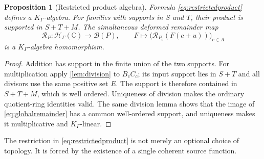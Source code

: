 \documentclass[11pt,letterpaper]{article}
\newtheorem{proposition}[theorem]{Proposition}
\theoremstyle{definition}
\theoremstyle{remark}
\newcommand{\C}{\mathbb C}
\newcommand{\HH}{\mathscr H_\Gamma}
\newcommand{\KG}{K_\Gamma}
\newcommand{\jet}{\mathcal R}
\newcommand{\BB}{\mathscr B(P)}
\numberwithin{equation}{section}
\begin{document}
\begin{proposition}[Restricted product algebra]\label{prop:restrictedalgebra}
Formula \eqref{eq:restrictedproduct} defines a $\KG$-algebra. For families with supports in $S$ and $T$, their product is supported in $S+T+M$. The simultaneous deformed remainder map
\begin{equation}\label{eq:globalremainder}
 \jet_P:\HH(\C)\longrightarrow\BB,
 \qquad F\longmapsto
 \bigl(\jet_{P_c}(F(c+u))\bigr)_{c\in A}
\end{equation}
is a $\KG$-algebra homomorphism.
\end{proposition}
\begin{proof}
Addition has support in the finite union of the two supports. For multiplication apply \cref{lem:division} to $B_cC_c$; its input support lies in $S+T$ and all divisors use the same positive set $E$. The support is therefore contained in $S+T+M$, which is well ordered. Uniqueness of division makes the ordinary quotient-ring identities valid. The same division lemma shows that the image of \eqref{eq:globalremainder} has a common well-ordered support, and uniqueness makes it multiplicative and $\KG$-linear.
\end{proof}
The restriction in \eqref{eq:restrictedproduct} is not merely an optional choice of topology. It is forced by the existence of a single coherent source function.
\end{document}
